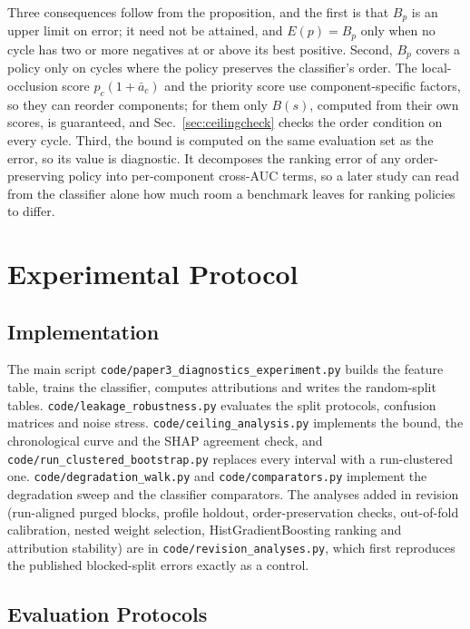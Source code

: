 \documentclass[journal]{IEEEtran}
\begin{document}
Three consequences follow from the proposition, and the first is that $B_p$ is an upper limit on error; it need not be
attained, and $E(p)=B_p$ only when no cycle has two or more negatives at or above
its best positive. Second, $B_p$ covers a policy only on cycles where the policy
preserves the classifier's order. The local-occlusion score
$p_c(1+\bar a_c)$ and the priority score use component-specific factors, so they can
reorder components; for them only $B(s)$, computed from their own scores, is
guaranteed, and Sec.~\ref{sec:ceilingcheck} checks the order condition on every
cycle. Third, the bound is computed on the same evaluation set as the error, so its
value is diagnostic. It decomposes the ranking error of any order-preserving policy
into per-component cross-AUC terms, so a later study can read from the classifier
alone how much room a benchmark leaves for ranking policies to differ.

\section{Experimental Protocol}
\label{sec:protocol}

\subsection{Implementation}

The main script \nolinkurl{code/paper3_diagnostics_experiment.py} builds the
feature table, trains the classifier, computes attributions and writes the
random-split tables. \nolinkurl{code/leakage_robustness.py} evaluates the split
protocols, confusion matrices and noise stress. \nolinkurl{code/ceiling_analysis.py}
implements the bound, the chronological curve and the SHAP agreement check, and
\nolinkurl{code/run_clustered_bootstrap.py} replaces every interval with a
run-clustered one. \nolinkurl{code/degradation_walk.py} and
\nolinkurl{code/comparators.py} implement the degradation sweep and the classifier
comparators. The analyses added in revision (run-aligned purged blocks,
profile holdout, order-preservation checks, out-of-fold calibration, nested weight
selection, HistGradientBoosting ranking and attribution stability) are in
\nolinkurl{code/revision_analyses.py}, which first reproduces the published
blocked-split errors exactly as a control.

\subsection{Evaluation Protocols}
\label{sec:splits}
\end{document}
